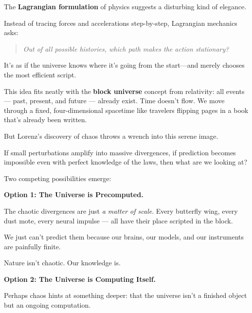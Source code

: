 \begin{tcolorbox}[title=Philosophical Sidebar: Is the Universe Precomputed or Winged on the Fly?, colback=gray!5!white, colframe=black!80!white, breakable, fonttitle=\bfseries]

    The \textbf{Lagrangian formulation} of physics suggests a disturbing kind of elegance.
    
    Instead of tracing forces and accelerations step-by-step,  
    Lagrangian mechanics asks:  
    \begin{quote}
    \textit{Out of all possible histories, which path makes the action stationary?}
    \end{quote}
    
    It’s as if the universe knows where it’s going from the start—and merely chooses the most efficient script.
    
    This idea fits neatly with the \textbf{block universe} concept from relativity:  
    all events — past, present, and future — already exist.  
    Time doesn’t flow.  
    We move through a fixed, four-dimensional spacetime like travelers flipping pages in a book that’s already been written.
    
    But Lorenz’s discovery of chaos throws a wrench into this serene image.
    
    If small perturbations amplify into massive divergences,  
    if prediction becomes impossible even with perfect knowledge of the laws,  
    then what are we looking at?
    
    Two competing possibilities emerge:
    
    \vspace{0.5em}
    
    \textbf{Option 1: The Universe is Precomputed.}
    
    The chaotic divergences are just \textit{a matter of scale}.  
    Every butterfly wing, every dust mote, every neural impulse — all have their place scripted in the block.
    
    We just can’t predict them because our brains, our models, and our instruments are painfully finite.
    
    Nature isn’t chaotic.  
    Our knowledge is.
    
    \vspace{0.5em}
    
    \textbf{Option 2: The Universe is Computing Itself.}
    
    Perhaps chaos hints at something deeper:  
    that the universe isn’t a finished object but an ongoing computation.  
    

\end{tcolorbox}
